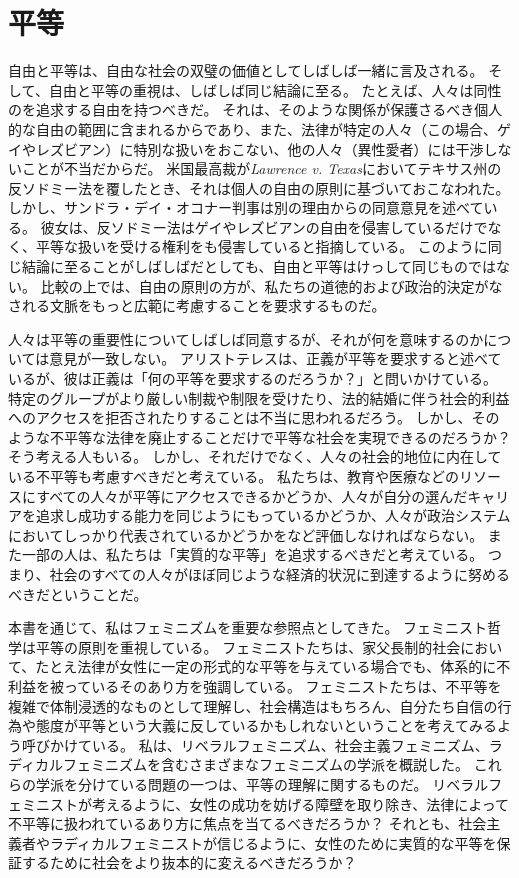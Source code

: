 \documentclass[paper=a4,book,openany]{jlreq} \usepackage{mystyle}
\begin{document}
\section{平等}

自由と平等は、自由な社会の双璧の価値としてしばしば一緒に言及される。
そして、自由と平等の重視は、しばしば同じ結論に至る。
たとえば、人々は同性のを追求する自由を持つべきだ。
それは、そのような関係が保護さるべき個人的な自由の範囲に含まれるからであり、また、法律が特定の人々（この場合、ゲイやレズビアン）に特別な扱いをおこない、他の人々（異性愛者）には干渉しないことが不当だからだ。
米国最高裁が\emph{Lawrence v. Texas}においてテキサス州の反ソドミー法を覆したとき、それは個人の自由の原則に基づいておこなわれた。
しかし、サンドラ・デイ・オコナー判事は別の理由からの同意意見を述べている。
彼女は、反ソドミー法はゲイやレズビアンの自由を侵害しているだけでなく、平等な扱いを受ける権利をも侵害していると指摘している。
このように同じ結論に至ることがしばしばだとしても、自由と平等はけっして同じものではない。
比較の上では、自由の原則の方が、私たちの道徳的および政治的決定がなされる文脈をもっと広範に考慮することを要求するものだ。

人々は平等の重要性についてしばしば同意するが、それが何を意味するのかについては意見が一致しない。
アリストテレスは、正義が平等を要求すると述べているが、彼は正義は「何の平等を要求するのだろうか？」と問いかけている。
特定のグループがより厳しい制裁や制限を受けたり、法的結婚に伴う社会的利益へのアクセスを拒否されたりすることは不当に思われるだろう。
しかし、そのような不平等な法律を廃止することだけで平等な社会を実現できるのだろうか？ そう考える人もいる。
しかし、それだけでなく、人々の社会的地位に内在している不平等も考慮すべきだと考えている。
私たちは、教育や医療などのリソースにすべての人々が平等にアクセスできるかどうか、人々が自分の選んだキャリアを追求し成功する能力を同じようにもっているかどうか、人々が政治システムにおいてしっかり代表されているかどうかをなど評価しなければならない。
また一部の人は、私たちは「実質的な平等」を追求するべきだと考えている。
つまり、社会のすべての人々がほぼ同じような経済的状況に到達するように努めるべきだということだ。

本書を通じて、私はフェミニズムを重要な参照点としてきた。
フェミニスト哲学は平等の原則を重視している。
フェミニストたちは、家父長制的社会において、たとえ法律が女性に一定の形式的な平等を与えている場合でも、体系的に不利益を被っているそのあり方を強調している。
フェミニストたちは、不平等を複雑で体制浸透的なものとして理解し、社会構造はもちろん、自分たち自信の行為や態度が平等という大義に反しているかもしれないということを考えてみるよう呼びかけている。
私は、リベラルフェミニズム、社会主義フェミニズム、ラディカルフェミニズムを含むさまざまなフェミニズムの学派を概説した。
これらの学派を分けている問題の一つは、平等の理解に関するものだ。
リベラルフェミニストが考えるように、女性の成功を妨げる障壁を取り除き、法律によって不平等に扱われているあり方に焦点を当てるべきだろうか？ それとも、社会主義者やラディカルフェミニストが信じるように、女性のために実質的な平等を保証するために社会をより抜本的に変えるべきだろうか？
\end{document}
